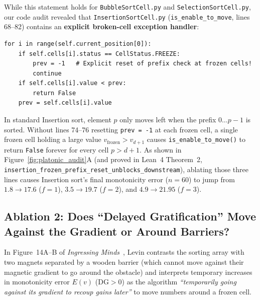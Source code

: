 \documentclass[11pt,a4paper]{article}
\theoremstyle{definition}
\theoremstyle{remark}
\newcommand{\DG}{\mathrm{DG}}
\begin{document}
While this statement holds for \texttt{BubbleSortCell.py} and \texttt{SelectionSortCell.py}, our code audit revealed that \texttt{InsertionSortCell.py} (\texttt{is\_enable\_to\_move}, lines 68--82) contains an \textbf{explicit broken-cell exception handler}:
\begin{verbatim}
for i in range(self.current_position[0]):
    if self.cells[i].status == CellStatus.FREEZE:
        prev = -1   # Explicit reset of prefix check at frozen cells!
        continue
    if self.cells[i].value < prev:
        return False
    prev = self.cells[i].value
\end{verbatim}
In standard Insertion sort, element $p$ only moves left when the prefix $0 \dots p-1$ is sorted. Without lines 74--76 resetting \texttt{prev = -1} at each frozen cell, a single frozen cell holding a large value $v_{\text{frozen}} > v_{d+1}$ causes \texttt{is\_enable\_to\_move()} to return \texttt{False} forever for every cell $p > d+1$. As shown in Figure~\ref{fig:platonic_audit}A (and proved in Lean~4 Theorem~2, \texttt{insertion\_frozen\_prefix\_reset\_unblocks\_downstream}), ablating those three lines causes Insertion sort's final monotonicity error ($n=60$) to jump from $1.8 \to 17.6$ ($f=1$), $3.5 \to 19.7$ ($f=2$), and $\mathbf{4.9 \to 21.95}$ ($f=3$).

\subsection{Ablation 2: Does ``Delayed Gratification'' Move Against the Gradient or Around Barriers?}

In Figure~14A--B of \emph{Ingressing Minds}~\cite{Levin2026Philosophies}, Levin contrasts the sorting array with two magnets separated by a wooden barrier (which cannot move against their magnetic gradient to go around the obstacle) and interprets temporary increases in monotonicity error $E(v)$ ($\DG > 0$) as the algorithm \emph{``temporarily going against its gradient to recoup gains later''} to move numbers around a frozen cell.
\end{document}
